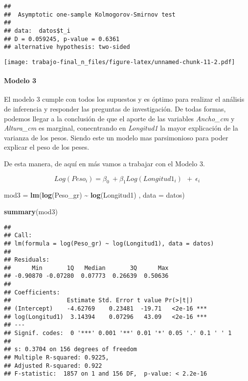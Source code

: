 \documentclass[
]{article}
\newenvironment{Shaded}{\begin{snugshade}}{\end{snugshade}}
\newcommand{\AttributeTok}[1]{\textcolor[rgb]{0.13,0.29,0.53}{#1}}
\newcommand{\FunctionTok}[1]{\textcolor[rgb]{0.13,0.29,0.53}{\textbf{#1}}}
\newcommand{\NormalTok}[1]{#1}
\newcommand{\OtherTok}[1]{\textcolor[rgb]{0.56,0.35,0.01}{#1}}
\newcommand{\SpecialCharTok}[1]{\textcolor[rgb]{0.81,0.36,0.00}{\textbf{#1}}}
\begin{document}
\begin{verbatim}
## 
##  Asymptotic one-sample Kolmogorov-Smirnov test
## 
## data:  datos$t_i
## D = 0.059245, p-value = 0.6361
## alternative hypothesis: two-sided
\end{verbatim}

\texttt{[image: trabajo-final\_n\_files/figure-latex/unnamed-chunk-11-2.pdf]}

\paragraph{Modelo 3}\label{modelo-3}

El modelo 3 cumple con todos los supuestos y es óptimo para realizar el
análisis de inferencia y responder las preguntas de investigación. De
todas formas, podemos llegar a la conclusión de que el aporte de las
variables \emph{Ancho\_cm} y \emph{Altura\_cm} es marginal, conecntrando
en \emph{Longitud1} la mayor explicación de la varianza de los pesos.
Siendo este un modelo mas parsimonioso para poder explicar el peso de
los peses.

De esta manera, de aquí en más vamos a trabajar con el Modelo 3.

\[Log(Peso_{i}) = \beta_0\ + \beta_1Log(Longitud1_{i})\ \ +\ \epsilon_i\]

\begin{Shaded}
\begin{Highlighting}[]
\NormalTok{mod3 }\OtherTok{=} \FunctionTok{lm}\NormalTok{(}\FunctionTok{log}\NormalTok{(Peso\_gr) }\SpecialCharTok{\textasciitilde{}} \FunctionTok{log}\NormalTok{(Longitud1)  , }\AttributeTok{data =}\NormalTok{ datos)}



\FunctionTok{summary}\NormalTok{(mod3)}
\end{Highlighting}
\end{Shaded}

\begin{verbatim}
## 
## Call:
## lm(formula = log(Peso_gr) ~ log(Longitud1), data = datos)
## 
## Residuals:
##      Min       1Q   Median       3Q      Max 
## -0.90870 -0.07280  0.07773  0.26639  0.50636 
## 
## Coefficients:
##                Estimate Std. Error t value Pr(>|t|)    
## (Intercept)    -4.62769    0.23481  -19.71   <2e-16 ***
## log(Longitud1)  3.14394    0.07296   43.09   <2e-16 ***
## ---
## Signif. codes:  0 '***' 0.001 '**' 0.01 '*' 0.05 '.' 0.1 ' ' 1
## 
## s: 0.3704 on 156 degrees of freedom
## Multiple R-squared: 0.9225,
## Adjusted R-squared: 0.922 
## F-statistic:  1857 on 1 and 156 DF,  p-value: < 2.2e-16
\end{verbatim}
\end{document}
